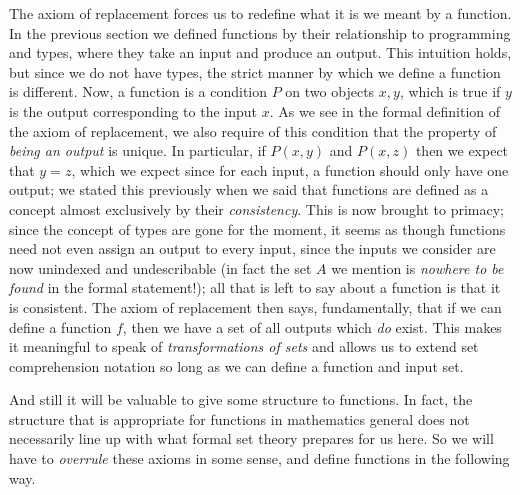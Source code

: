 \documentclass[11pt]{article}
\begin{document}
The axiom of replacement forces us to redefine what it is we meant by a function. In the previous section we defined functions by their relationship to programming and types, where they take an input and produce an output. This intuition holds, but since we do not have types, the strict manner by which we define a function is different. Now, a function is a condition $P$ on two objects $x,y$, which is true if $y$ is the output corresponding to the input $x$. As we see in the formal definition of the axiom of replacement, we also require of this condition that the property of \emph{being an output} is unique. In particular, if $P(x,y)$ and $P(x,z)$ then we expect that $y=z$, which we expect since for each input, a function should only have one output; we stated this previously when we said that functions are defined as a concept almost exclusively by their \emph{consistency}. This is now brought to primacy; since the concept of types are gone for the moment, it seems as though functions need not even assign an output to every input, since the inputs we consider are now unindexed and undescribable (in fact the set $A$ we mention is \emph{nowhere to be found} in the formal statement!); all that is left to say about a function is that it is consistent. The axiom of replacement then says, fundamentally, that if we can define a function $f$, then we have a set of all outputs which \emph{do} exist. This makes it meaningful to speak of \emph{transformations of sets} and allows us to extend set comprehension notation so long as we can define a function and input set.

And still it will be valuable to give some structure to functions. In fact, the structure that is appropriate for functions in mathematics general does not necessarily line up with what formal set theory prepares for us here. So we will have to \emph{overrule} these axioms in some sense, and define functions in the following way.
\end{document}
